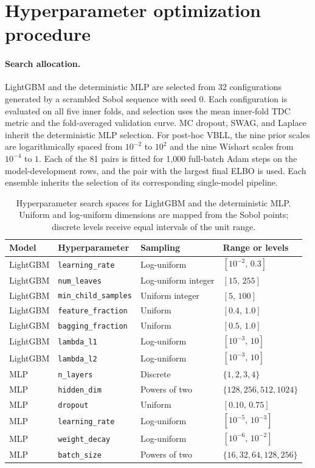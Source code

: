 \section{Hyperparameter optimization procedure}
\label{app:hpo-adequacy}

\paragraph{Search allocation.}
LightGBM and the deterministic MLP are selected from 32 configurations generated by a scrambled
Sobol sequence with seed 0. Each configuration is evaluated on all five inner folds, and selection
uses the mean inner-fold TDC metric and the fold-averaged validation curve. MC dropout, SWAG, and
Laplace inherit the deterministic MLP selection. For post-hoc VBLL, the nine prior scales are
logarithmically spaced from $10^{-2}$ to $10^2$ and the nine Wishart scales from $10^{-4}$ to $1$.
Each of the 81 pairs is fitted for 1,000 full-batch Adam steps on the model-development rows, and the pair
with the largest final ELBO is used. Each ensemble inherits the selection of its corresponding
single-model pipeline.

\begin{table}[!htbp]
\centering
\caption{Hyperparameter search spaces for LightGBM and the deterministic MLP. Uniform and
log-uniform dimensions are mapped from the Sobol points; discrete levels receive equal intervals of
the unit range.}
\label{tab:hpo-spaces}
\small
\begin{tabularx}{\textwidth}{@{}lllX@{}}
\toprule
Model & Hyperparameter & Sampling & Range or levels \tabularnewline
\midrule
LightGBM & \texttt{learning\_rate} & Log-uniform & $[10^{-2},\,0.3]$ \tabularnewline
LightGBM & \texttt{num\_leaves} & Log-uniform integer & $[15,\,255]$ \tabularnewline
LightGBM & \texttt{min\_child\_samples} & Uniform integer & $[5,\,100]$ \tabularnewline
LightGBM & \texttt{feature\_fraction} & Uniform & $[0.4,\,1.0]$ \tabularnewline
LightGBM & \texttt{bagging\_fraction} & Uniform & $[0.5,\,1.0]$ \tabularnewline
LightGBM & \texttt{lambda\_l1} & Log-uniform & $[10^{-3},\,10]$ \tabularnewline
LightGBM & \texttt{lambda\_l2} & Log-uniform & $[10^{-3},\,10]$ \tabularnewline
\addlinespace
MLP & \texttt{n\_layers} & Discrete & $\{1,2,3,4\}$ \tabularnewline
MLP & \texttt{hidden\_dim} & Powers of two & $\{128,256,512,1024\}$ \tabularnewline
MLP & \texttt{dropout} & Uniform & $[0.10,\,0.75]$ \tabularnewline
MLP & \texttt{learning\_rate} & Log-uniform & $[10^{-5},\,10^{-3}]$ \tabularnewline
MLP & \texttt{weight\_decay} & Log-uniform & $[10^{-6},\,10^{-2}]$ \tabularnewline
MLP & \texttt{batch\_size} & Powers of two & $\{16,32,64,128,256\}$ \tabularnewline
\bottomrule
\end{tabularx}
\end{table}
\FloatBarrier

